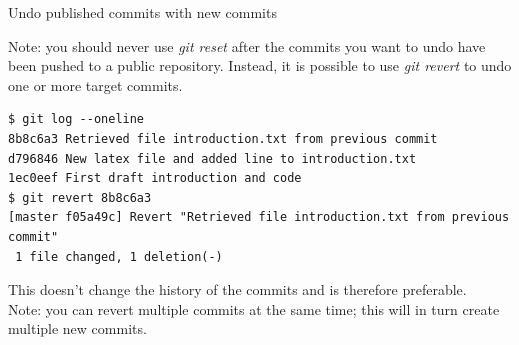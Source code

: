 \documentclass[10pt]{beamer}
\begin{document}
\begin{frame}[fragile]{Undo published commits with new commits}

Note: you should never use \textit{git reset} after the commits you want to undo have been pushed to a public repository. Instead, it is possible to use \textit{git revert} to undo one or more target commits.

\begin{lstlisting}
$ git log --oneline
8b8c6a3	Retrieved file introduction.txt from previous commit
d796846	New latex file and added line to introduction.txt
1ec0eef	First draft introduction and code
$ git revert 8b8c6a3
[master f05a49c] Revert "Retrieved file introduction.txt from previous commit"
 1 file changed, 1 deletion(-)
\end{lstlisting}

This doesn't change the history of the commits and is therefore preferable.\\
\medskip
Note: you can revert multiple commits at the same time; this will in turn create multiple new commits.



\end{frame}
\end{document}
